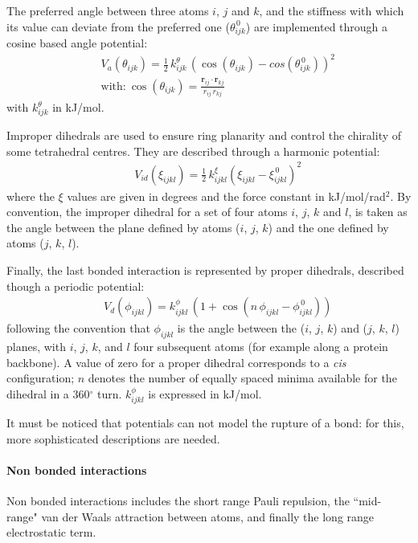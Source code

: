 The preferred angle between three atoms $i$, $j$ and $k$, and the stiffness with which its value can deviate from the preferred one ($\theta^{\, 0}_{ijk}$) are implemented through a cosine based angle potential:
\begin{eqnarray}
&& V_a(\theta_{ijk}) = \frac{1}{2}\,k^\theta_{ijk}\,\left(\cos\left(\theta_{ijk}\right) - cos\left(\theta^{\, 0}_{ijk}\right)\right)^2 \\
&& \text{with:} \ \cos\left(\theta_{ijk}\right) = \frac{\textbf{r}_{ij}\cdot \textbf{r}_{kj}}{r_{ij}\,r_{kj}}
\end{eqnarray}
with $k^\theta_{ijk}$ in kJ/mol.

Improper dihedrals are used to ensure ring planarity and control the chirality of some tetrahedral centres. They are described through a harmonic potential:
\begin{eqnarray}
&& V_{id} (\xi_{ijkl}) = \frac{1}{2}\,k_{ijkl}^\xi \left( \xi_{ijkl} - \xi_{ijkl}^{\, 0} \right)^2
\end{eqnarray}
where the $\xi$ values are given in degrees and the force constant in kJ/mol/rad$^2$. By convention, the improper dihedral for a set of four atoms $i$, $j$, $k$ and $l$, is taken as the angle between the plane defined by atoms ($i$, $j$, $k$) and the one defined by atoms ($j$, $k$, $l$).

Finally, the last bonded interaction is represented by proper dihedrals, described though a periodic potential:
\begin{eqnarray}
&& V_d(\phi_{ijkl}) = k_{ijkl}^\phi\,\left( 1 + \cos\left( n \, \phi_{ijkl} - \phi_{ijkl}^{\, 0} \right) \right)
\end{eqnarray}
following the convention that $\phi_{ijkl}$ is the angle between the ($i$, $j$, $k$) and ($j$, $k$, $l$) planes, with $i$, $j$, $k$, and $l$ four subsequent atoms (for example along a protein backbone). A value of zero for a proper dihedral corresponds to a \textit{cis} configuration; $n$ denotes the number of equally spaced minima available for the dihedral in a 360$^\circ$ turn. $k_{ijkl}^\phi$ is expressed in kJ/mol.

It must be noticed that potentials can not model the rupture of a bond: for this, more sophisticated descriptions are needed.


\paragraph{Non bonded interactions}

Non bonded interactions includes the short range Pauli repulsion, the ``mid-range" van der Waals attraction between atoms, and finally the long range electrostatic term.

